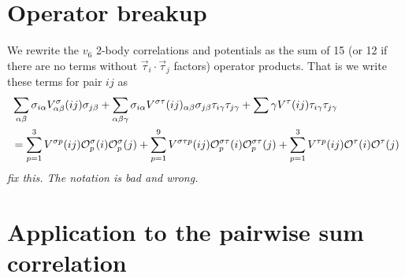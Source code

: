 \documentclass[12pt]{article}
\begin{document}
\section{Operator breakup}
We rewrite the $v_6$
2-body correlations and potentials as the sum of 15  (or 12
if there are no terms without $\vec \tau_i \cdot\vec \tau_j$ factors)
operator products. That is we write these terms for pair $ij$ as
\begin{equation}
\begin{split}
&\sum_{\alpha\beta} \sigma_{i\alpha} V^\sigma_{\alpha\beta}(ij)\sigma_{j\beta}
+\sum_{\alpha\beta\gamma} \sigma_{i\alpha} V^{\sigma\tau}(ij)
_{\alpha\beta}\sigma_{j\beta}\tau_{i\gamma}\tau_{j\gamma}
+\sum{\gamma}
V^\tau(ij) \tau_{i\gamma}\tau_{j\gamma}
\\
&= \sum_{p=1}^{3} V^{\sigma p}(ij) {\cal O}^\sigma_p(i){\cal O}^\sigma_p(j)
+\sum_{p=1}^{9} V^{\sigma\tau p}(ij)
{\cal O}^{\sigma\tau}_p(i){\cal O}^{\sigma\tau}_p(j)
+\sum_{p=1}^{3} V^{\tau p}(ij) {\cal O}^\tau(i){\cal O}^\tau(j)
\end{split}
\end{equation}
{\em fix this. The notation is bad and wrong.}

\section{Application to the pairwise sum correlation}
\end{document}
